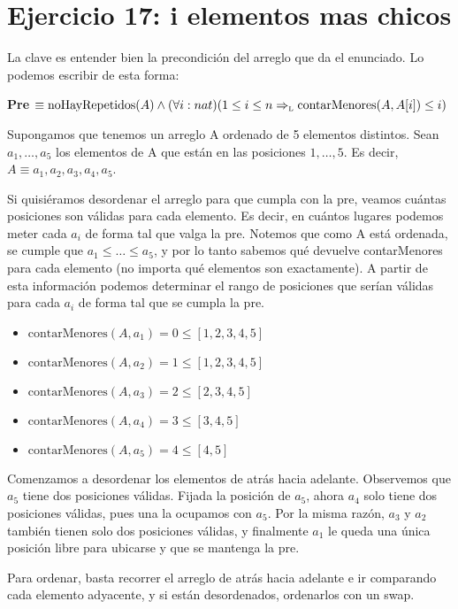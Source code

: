 \section{Ejercicio 17: i elementos mas chicos}

La clave es entender bien la precondición del arreglo que da el enunciado. Lo podemos escribir de esta forma:

\textbf{Pre} $\equiv \text{noHayRepetidos}(A) \land (\forall i: nat)(1 \leq i \leq n \Rightarrow_{\mathrm{\scriptscriptstyle{L}}} \text{contarMenores}(A, A[i]) \leq i)$

Supongamos que tenemos un arreglo A ordenado de 5 elementos distintos. Sean $a_1, \dots, a_5$ los elementos de A que están en las posiciones $1, \dots, 5$. Es decir, $A \equiv a_1, a_2, a_3, a_4, a_5$.

Si quisiéramos desordenar el arreglo para que cumpla con la pre, veamos cuántas posiciones son válidas para cada elemento. Es decir, en cuántos lugares podemos meter cada $a_i$ de forma tal que valga la pre. Notemos que como A está ordenada, se cumple que $a_1 \leq \dots \leq a_5$, y por lo tanto sabemos qué devuelve contarMenores para cada elemento (no importa qué elementos son exactamente). A partir de esta información podemos determinar el rango de posiciones que serían válidas para cada $a_i$ de forma tal que se cumpla la pre.

\begin{itemize}
    \item $\text{contarMenores}(A, a_1) = 0 \leq [1, 2, 3, 4, 5]$
    \item $\text{contarMenores}(A, a_2) = 1 \leq [1, 2, 3, 4, 5]$
    \item $\text{contarMenores}(A, a_3) = 2 \leq [2, 3, 4, 5]$
    \item $\text{contarMenores}(A, a_4) = 3 \leq [3, 4, 5]$
    \item $\text{contarMenores}(A, a_5) = 4 \leq [4, 5]$
\end{itemize}

Comenzamos a desordenar los elementos de atrás hacia adelante. Observemos que $a_5$ tiene dos posiciones válidas. Fijada la posición de $a_5$, ahora $a_4$ solo tiene dos posiciones válidas, pues una la ocupamos con $a_5$. Por la misma razón, $a_3$ y $a_2$ también tienen solo dos posiciones válidas, y finalmente $a_1$ le queda una única posición libre para ubicarse y que se mantenga la pre.

Para ordenar, basta recorrer el arreglo de atrás hacia adelante e ir comparando cada elemento adyacente, y si están desordenados, ordenarlos con un swap.


